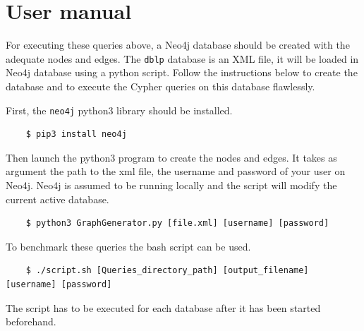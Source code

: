 \documentclass{article}
\begin{document}
\appendix

\section{User manual}

For executing these queries above, a Neo4j database should be created with the adequate nodes and edges. The \texttt{dblp} database is an XML file, it will be loaded in Neo4j database using a python script. Follow the instructions below to create the database and to execute the Cypher queries on this database flawlessly.

First, the \texttt{neo4j} python3 library should be installed.
\begin{lstlisting}
    $ pip3 install neo4j
\end{lstlisting}

Then launch the python3 program to create the nodes and edges. It takes as argument the path to the xml file, the username and password of your user on Neo4j. Neo4j is assumed to be running locally and the script will modify the current active database.

\begin{lstlisting}
    $ python3 GraphGenerator.py [file.xml] [username] [password]
\end{lstlisting}

To benchmark these queries the bash script can be used. 

\begin{lstlisting}
    $ ./script.sh [Queries_directory_path] [output_filename] [username] [password]
\end{lstlisting}

The script has to be executed for each database after it has been started beforehand. 
\end{document}
